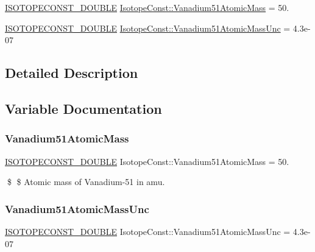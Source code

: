 \begin{DoxyCompactItemize}
\item 
\mbox{\hyperlink{group___isotope_const-_macros_ga8f45a7272ce02c0b4c65c44636ed719a}{I\+S\+O\+T\+O\+P\+E\+C\+O\+N\+S\+T\+\_\+\+D\+O\+U\+B\+LE}} \mbox{\hyperlink{group___isotope_const-_vanadium-_v51_ga33f3dda927f5e70ac8f8b642648855e6}{Isotope\+Const\+::\+Vanadium51\+Atomic\+Mass}} = 50.
\item 
\mbox{\hyperlink{group___isotope_const-_macros_ga8f45a7272ce02c0b4c65c44636ed719a}{I\+S\+O\+T\+O\+P\+E\+C\+O\+N\+S\+T\+\_\+\+D\+O\+U\+B\+LE}} \mbox{\hyperlink{group___isotope_const-_vanadium-_v51_ga46b7ef13e731ae3f64a505ee6342e417}{Isotope\+Const\+::\+Vanadium51\+Atomic\+Mass\+Unc}} = 4.\+3e-\/07
\end{DoxyCompactItemize}


\subsection{Detailed Description}


\subsection{Variable Documentation}
\mbox{\label{group___isotope_const-_vanadium-_v51_ga33f3dda927f5e70ac8f8b642648855e6}} 
\subsubsection{\texorpdfstring{Vanadium51\+Atomic\+Mass}{Vanadium51AtomicMass}}
{\footnotesize\ttfamily \mbox{\hyperlink{group___isotope_const-_macros_ga8f45a7272ce02c0b4c65c44636ed719a}{I\+S\+O\+T\+O\+P\+E\+C\+O\+N\+S\+T\+\_\+\+D\+O\+U\+B\+LE}} Isotope\+Const\+::\+Vanadium51\+Atomic\+Mass = 50.}

\$ \$ Atomic mass of Vanadium-\/51 in amu. \mbox{\label{group___isotope_const-_vanadium-_v51_ga46b7ef13e731ae3f64a505ee6342e417}} 
\subsubsection{\texorpdfstring{Vanadium51\+Atomic\+Mass\+Unc}{Vanadium51AtomicMassUnc}}
{\footnotesize\ttfamily \mbox{\hyperlink{group___isotope_const-_macros_ga8f45a7272ce02c0b4c65c44636ed719a}{I\+S\+O\+T\+O\+P\+E\+C\+O\+N\+S\+T\+\_\+\+D\+O\+U\+B\+LE}} Isotope\+Const\+::\+Vanadium51\+Atomic\+Mass\+Unc = 4.\+3e-\/07}

